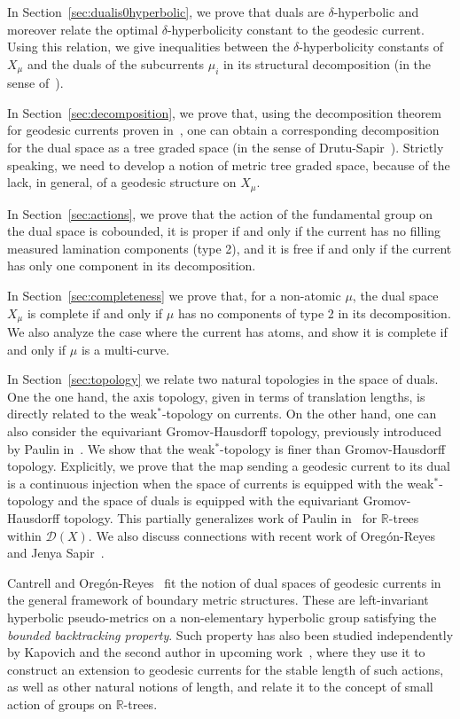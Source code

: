 \documentclass[12pt,article]{amsart}
\numberwithin{equation}{section}
\numberwithin{figure}{section}
\theoremstyle{definition}
\theoremstyle{plain}
\begin{document}
In Section~\ref{sec:dualis0hyperbolic}, we prove that duals are $\delta$-hyperbolic and moreover relate the optimal $\delta$-hyperbolicity constant to the geodesic current. Using this relation, we give inequalities between the $\delta$-hyperbolicity constants of $X_{\mu}$ and the duals of the subcurrents $\mu_i$ in its structural decomposition (in the sense of~\cite{BIPP21:Currents}).

In Section~\ref{sec:decomposition}, we prove that, using the decomposition theorem for geodesic currents proven in~\cite{BIPP21:Currents}, one can obtain a corresponding decomposition for the dual space as a tree graded space (in the sense of Drutu-Sapir~\cite{DS05:Treegraded}). Strictly speaking, we need to develop a notion of metric tree graded space, because of the lack, in general, of a geodesic structure on $X_{\mu}$.

In Section~\ref{sec:actions}, we prove that the action of the fundamental group on the dual space is cobounded, it is proper if and only if the current has no filling measured lamination components (type 2), and it is free if and only if the current has only one component in its decomposition.

In Section~\ref{sec:completeness} we prove that, for a non-atomic $\mu$, 
the dual space $X_{\mu}$ is complete if and only if $\mu$ has no components of type 2 in its decomposition. We also analyze the case where the current has atoms, and show it is complete if and only if $\mu$ is a multi-curve.

In Section~\ref{sec:topology} we relate two natural topologies in the space of duals. One the one hand, the axis topology, given in terms of translation lengths, is directly related to the weak$^*$-topology on currents. On the other hand, one can also consider the equivariant Gromov-Hausdorff topology, previously introduced by Paulin in~\cite{Pau88:Thesis}. 
We show that the weak$^*$-topology is finer than Gromov-Hausdorff topology. Explicitly, we prove that the map sending a geodesic current to its dual is a continuous injection when the space of currents is equipped with the weak$^*$-topology and the space of duals is equipped with the equivariant Gromov-Hausdorff topology. This partially generalizes work of Paulin in~\cite{Pa89:Paulin1989TheGT} for $\mathbb{R}$-trees within $\mathcal{D}(X)$. We also discuss connections with recent work of Oreg\'on-Reyes~\cite{OR22:SpaceMetric} and Jenya Sapir~\cite{Sap22:ExtensionThurston}.

Cantrell and Oreg\'on-Reyes~\cite{COR22:Manhattan} fit the notion of dual spaces of geodesic currents in the general framework of boundary metric structures. These are left-invariant hyperbolic pseudo-metrics on a non-elementary hyperbolic group satisfying the \emph{bounded backtracking property}.
Such property has also been studied independently by Kapovich and the second author in upcoming work~\cite{KMG:BBP}, where they use it to construct an extension to geodesic currents for the stable length of such actions, as well as other natural notions of length, and relate it to the concept of small action of groups on $\mathbb{R}$-trees.
\end{document}
